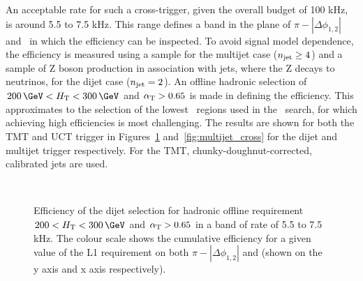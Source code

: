 An acceptable rate for such a cross-trigger, given the overall budget of 100 kHz, is 
around 5.5 to 7.5 kHz. This range defines a band in the plane of $\pi - |\Delta\phi_{1,2}|$
and \scalht~in which the efficiency can be inspected. To avoid signal model dependence, the 
efficiency is measured using a \ttbar sample for the multijet case ($n_{\mathrm{jet}} \ge 4$) and a sample  
of Z boson production in association with jets, where the Z decays to neutrinos, for the 
dijet case ($n_{\mathrm{jet}} = 2$). An offline hadronic selection of $200\,\GeV < \scalht < 300\,\GeV$ 
and $\alpha_{\text{T}} > 0.65$ is made in defining the efficiency. This approximates to the selection
of the lowest \scalht~regions used in the \alphat~search, for which achieving high efficiencies is most challenging.
The results are shown for both the TMT and UCT trigger in Figures~\ref{fig:dijet_cross} and~\ref{fig:multijet_cross} 
for the dijet and multijet trigger respectively. For the TMT, chunky-doughnut-corrected, calibrated jets are used.

\begin{figure}
\centering
	~
	\caption{Efficiency of the dijet selection for hadronic offline requirement $200 < \scalht < 300\,\GeV$ and $\alpha_{\text{T}} > 0.65$
	in a band of rate of 5.5 to 7.5 kHz. The colour scale shows the cumulative efficiency for a given value of the 
	L1 requirement on both $\pi - |\Delta\phi_{1,2}|$ and \scalht (shown on the y axis and x axis respectively).}
	    \label{fig:dijet_cross}
\end{figure}

